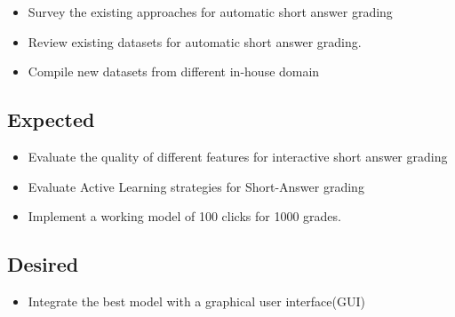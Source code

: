 \documentclass[rnd]{mas_proposal}
\begin{document}
\begin{itemize}
    \item Survey the existing approaches for automatic short answer grading
    \item Review existing datasets for automatic short answer grading.
    \item Compile new datasets from different in-house domain
\end{itemize}

\subsection{Expected}
\begin{itemize}
    \item Evaluate the quality of different features for interactive short answer grading
    \item Evaluate Active Learning strategies for Short-Answer grading
    \item Implement a working model of 100 clicks for 1000 grades.
\end{itemize}

\subsection{Desired}
\begin{itemize}
    \item Integrate the best model with a graphical user interface(GUI)
\end{itemize}


\nocite{*}

\end{document}
